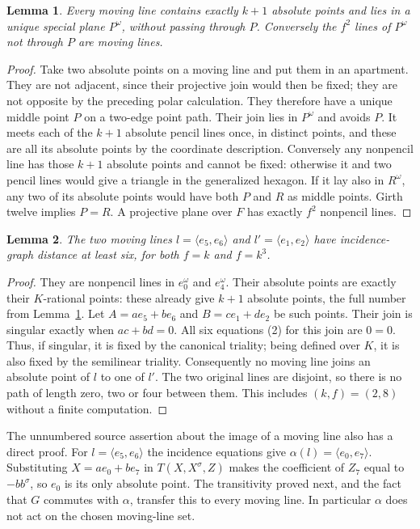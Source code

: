 \documentclass[11pt,a4paper]{article}
\newtheorem{lemma}{Lemma}\newtheorem{theorem}[lemma]{Theorem}
\newcommand{\gen}[1]{\langle #1\rangle}
\begin{document}
\begin{lemma}\label{plane}
Every moving line contains exactly $k+1$ absolute points and lies in a
unique special plane $P^\omega$, without passing through $P$.
Conversely the $f^2$ lines of $P^\omega$ not through $P$ are moving lines.
\end{lemma}
\begin{proof}
Take two absolute points on a moving line and put them in an apartment.
They are not adjacent, since their projective join would then be fixed;
they are not opposite by the preceding polar calculation. They therefore
have a unique middle point $P$ on a two-edge point path. Their join lies
in $P^\omega$ and avoids $P$. It meets each of the $k+1$ absolute pencil
lines once, in distinct points, and these are all its absolute points by
the coordinate description. Conversely any nonpencil line has those
$k+1$ absolute points and cannot be fixed: otherwise it and two pencil
lines would give a triangle in the generalized hexagon.
If it lay also in $R^\omega$, any two of its absolute points would have
both $P$ and $R$ as middle points. Girth twelve implies $P=R$.
A projective plane over $F$ has exactly $f^2$ nonpencil lines.
\end{proof}

\begin{lemma}\label{far}
The two moving lines $l=\gen{e_5,e_6}$ and $l'=\gen{e_1,e_2}$
have incidence-graph distance at least six, for both $f=k$ and $f=k^3$.
\end{lemma}
\begin{proof}
They are nonpencil lines in $e_0^\omega$ and $e_4^\omega$.
Their absolute points are exactly their $K$-rational points: these already
give $k+1$ absolute points, the full number from Lemma~\ref{plane}.
Let $A=a e_5+b e_6$ and $B=c e_1+d e_2$ be such points. Their join is
singular exactly when $ac+bd=0$. All six equations (2) for this join
are $0=0$. Thus, if singular, it is fixed by the canonical triality;
being defined over $K$, it is also fixed by the semilinear triality.
Consequently no moving line joins an absolute point of $l$ to one of $l'$.
The two original lines are disjoint, so there is no path of length zero,
two or four between them. This includes $(k,f)=(2,8)$ without a finite
computation.
\end{proof}

The unnumbered source assertion about the image of a moving line also
has a direct proof. For $l=\gen{e_5,e_6}$ the incidence equations give
$\alpha(l)=\gen{e_0,e_7}$. Substituting $X=a e_0+b e_7$ in
$T(X,X^\sigma,Z)$ makes the coefficient of $Z_7$ equal to $-bb^\sigma$,
so $e_0$ is its only absolute point. The transitivity proved next, and
the fact that $G$ commutes with $\alpha$, transfer this to every moving
line. In particular $\alpha$ does not act on the chosen moving-line set.
\end{document}
